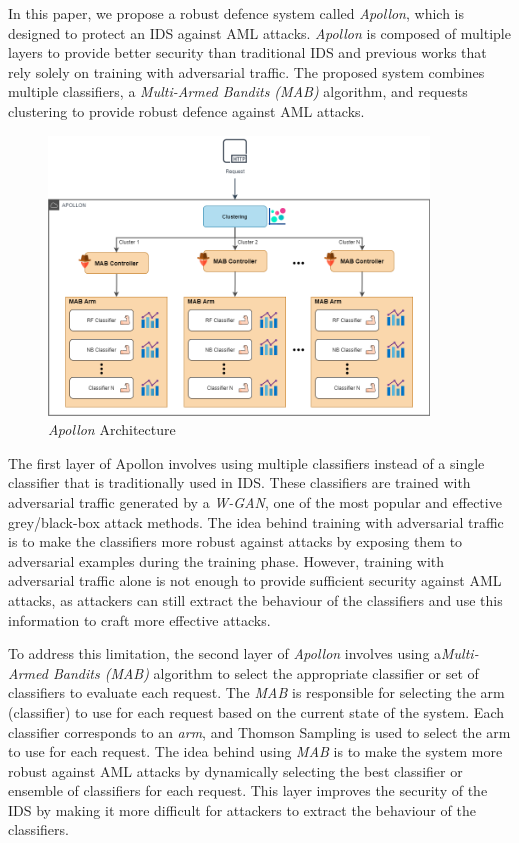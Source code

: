 In this paper, we propose a robust defence system called \textit{Apollon}, which is designed to protect an IDS against AML
attacks.
\textit{Apollon} is composed of multiple layers to provide better security than traditional IDS and previous works that rely
solely on training with adversarial traffic.
The proposed system combines multiple classifiers, a \textit{Multi-Armed Bandits (MAB)} algorithm, and requests clustering to
provide robust defence against AML attacks.

\begin{figure}
    \centering
    \includegraphics[width=0.9\textwidth]{Apollon.png}
    \caption{\textit{Apollon} Architecture}
    \label{fig:apollon-architecture}
\end{figure}

The first layer of Apollon involves using multiple classifiers instead of a single classifier that is traditionally
used in IDS.
These classifiers are trained with adversarial traffic generated by a \textit{W-GAN}, one of the most popular and effective
grey/black-box attack methods.
The idea behind training with adversarial traffic is to make the classifiers more robust against attacks by exposing
them to adversarial examples during the training phase.
However, training with adversarial traffic alone is not enough to provide sufficient security against AML attacks, as
attackers can still extract the behaviour of the classifiers and use this information to craft more effective attacks.

To address this limitation, the second layer of \textit{Apollon} involves using a\textit{Multi-Armed Bandits (MAB)}
algorithm to select the appropriate classifier or set of classifiers to evaluate each request.
The \textit{MAB} is responsible for selecting the arm (classifier) to use for each request based on the current state of the
system.
Each classifier corresponds to an \textit{arm}, and Thomson Sampling is used to select the arm to use for each request.
The idea behind using \textit{MAB} is to make the system more robust against AML attacks by dynamically selecting the best
classifier or ensemble of classifiers for each request.
This layer improves the security of the IDS by making it more difficult for attackers to extract the behaviour of the
classifiers.

